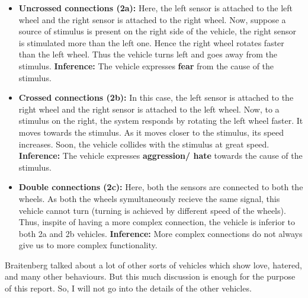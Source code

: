 \documentclass[main.tex]{subfiles}
\begin{document}
\begin{enumerate}
        \begin{itemize}
            \item \textbf{Uncrossed connections (2a):} Here, the left sensor is attached to the left wheel and the right sensor is attached to the right wheel. Now, suppose a source of stimulus is present on the right side of the vehicle, the right sensor is stimulated more than the left one. Hence the right wheel rotates faster than the left wheel. Thus the vehicle turns left and goes away from the stimulus. \textbf{Inference:} The vehicle expresses \textbf{fear} from the cause of the stimulus.
            \item \textbf{Crossed connections (2b):} In this case, the left sensor is attached to the right wheel and the right sensor is attached to the left wheel. Now, to a stimulus on the right, the system responds by rotating the left wheel faster. It moves towards the stimulus. As it moves closer to the stimulus, its speed increases. Soon, the vehicle collides with the stimulus at great speed. \textbf{Inference:} The vehicle expresses \textbf{aggression/ hate} towards the cause of the stimulus.
            \item \textbf{Double connections (2c):} Here, both the sensors are connected to both the wheels. As both the wheels symultaneously recieve the same signal, this vehicle cannot turn (turning is achieved by different speed of the wheels). Thus, inspite of having a more complex connection, the vehicle is inferior to both 2a and 2b vehicles. \textbf{Inference:} More complex connections do not always give us to more complex functionality.
        \end{itemize}

    \end{enumerate}
    
    Braitenberg talked about a lot of other sorts of vehicles which show love, hatered, and many other behaviours. But this much discussion is enough for the purpose of this report. So, I will not go into the details of the other vehicles.
\end{document}
